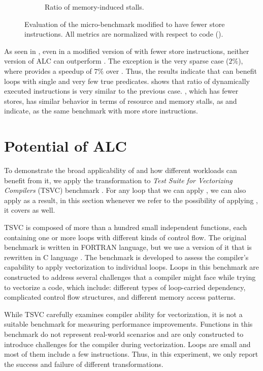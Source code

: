 \begin{figure}[h!]
\begin{subfigure}{.5\textwidth}
    \caption{Ratio of memory-induced stalls.}
    \label{fig:single-if-few-scatter-mem-stalls}
  \end{subfigure}%
  \caption{Evaluation of the \ifElseBench micro-benchmark modified to have fewer store instructions. All metrics are normalized with respect to \ifconverted code (\ifconv).}
\end{figure}


As seen in , even in a modified version of \ifThenBench with fewer store instructions, neither version of ALC can outperform \ifconv.
The exception is the very sparse case ($2\%$), where \ALCdp provides a speedup of $7\%$ over \ifconv.
Thus, the results indicate that \ALCdp can benefit loops with single \cpath and very few true predicates.
 shows that ratio of dynamically executed instructions is very similar to the previous case. 
\ifThenBench, which has fewer stores, has similar behavior in terms of resource and memory stalls, as  and  indicate, as the same benchmark with more store instructions.


\section{Potential of ALC}

To demonstrate the broad applicability of \ALC and how different workloads can benefit from it, we apply the transformation to \emph{Test Suite for Vectorizing Compilers} (TSVC) benchmark \cite{levine1991comparative}. For any loop that we can apply \ALC, we can also apply \datapermutation as a result, in this section whenever we refer to the possibility of applying \ALC, it covers \datapermutation as well.


TSVC is composed of more than a hundred small independent functions, each containing one or more loops with different kinds of control flow. The original benchmark is written in FORTRAN language, but we use a version of it that is rewritten in C language \cite{tsvc2}. The benchmark is developed to assess the compiler's capability to apply vectorization to individual loops. Loops in this benchmark are constructed to address several challenges that a compiler might face while trying to vectorize a code, which include: different types of loop-carried dependency, complicated control flow structures, and different memory access patterns. 

While TSVC carefully examines compiler ability for vectorization, it is not a suitable benchmark for measuring performance improvements. Functions in this benchmark do not represent real-world scenarios and are only constructed to introduce challenges for the compiler during vectorization. Loops are small and most of them include a few instructions. Thus, in this experiment, we only report the success and failure of different transformations.

